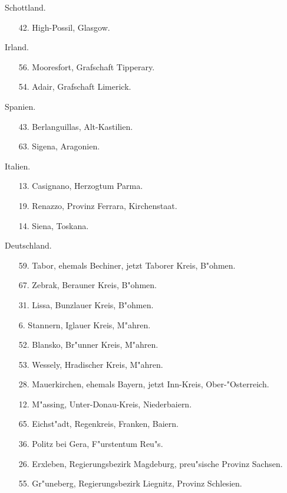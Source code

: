 \documentclass[a4paper, 11pt, oneside, polutonikogreek, german]{article}
\begin{document}
\begin{center}
Schottland.
\end{center}
\begin{itemize}
    \small
    \item[42.] High-Possil, Glasgow.
\end{itemize}
\begin{center}
Irland.
\end{center}
\begin{itemize}
    \small
    \item[56.] Mooresfort, Grafschaft Tipperary.
    \item[54.] Adair, Grafschaft Limerick.
\end{itemize}
\begin{center}
Spanien.
\end{center}
\begin{itemize}
    \small
    \item[43.] Berlanguillas, Alt-Kastilien.
    \item[63.] Sigena, Aragonien.
\end{itemize}
\begin{center}
Italien.
\end{center}
\begin{itemize}
    \small
    \item[13.] Casignano, Herzogtum Parma.
    \item[19.] Renazzo, Provinz Ferrara, Kirchenstaat.
    \item[14.] Siena, Toskana.
\end{itemize}
\begin{center}
Deutschland.
\end{center}
\begin{itemize}
    \small
    \item[59.] Tabor, ehemals Bechiner, jetzt Taborer Kreis, B"ohmen.
    \item[67.] Zebrak, Berauner Kreis, B"ohmen.
    \item[31.] Lissa, Bunzlauer Kreis, B"ohmen.
    \item[6.] Stannern, Iglauer Kreis, M"ahren.
    \item[52.] Blansko, Br"unner Kreis, M"ahren.
    \item[53.] Wessely, Hradischer Kreis, M"ahren.
    \item[28.] Mauerkirchen, ehemals Bayern, jetzt Inn-Kreis, Ober-"Osterreich.
    \item[12.] M"assing, Unter-Donau-Kreis, Niederbaiern.
    \item[65.] Eichst"adt, Regenkreis, Franken, Baiern.
    \item[36.] Politz bei Gera, F"urstentum Reu"s.
    \item[26.] Erxleben, Regierungsbezirk Magdeburg, preu"sische Provinz Sachsen.
    \item[55.] Gr"uneberg, Regierungsbezirk Liegnitz, Provinz Schlesien.
\end{itemize}
\end{document}
